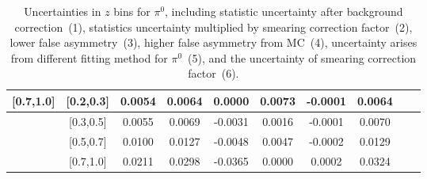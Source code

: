 \begin{table}[H]
\begin{tabular}{|c| c| c| c| c| c| c| c| c| c|}
[0.7,1.0]	&	[0.2,0.3]	&	0.0054	&	0.0064	&	0.0000	&	0.0073	&	-0.0001	&	0.0064	\\ \hline
[0.7,1.0]	&	[0.3,0.5]	&	0.0055	&	0.0069	&	-0.0031	&	0.0016	&	-0.0001	&	0.0070	\\ \hline
[0.7,1.0]	&	[0.5,0.7]	&	0.0100	&	0.0127	&	-0.0048	&	0.0047	&	-0.0002	&	0.0129	\\ \hline
[0.7,1.0]	&	[0.7,1.0]	&	0.0211	&	0.0298	&	-0.0365	&	0.0000	&	0.0002	&	0.0324	\\ \hline
\end{tabular}
\caption{Uncertainties in $z$ bins for $\pi^0$, including statistic uncertainty after background correction~(1), statistics uncertainty multiplied by smearing correction factor~(2), lower false asymmetry~(3), higher false asymmetry from MC~(4), uncertainty arises from different fitting method for $\pi^0$~(5), and the uncertainty of smearing correction factor~(6).}
\label{tab:pi0errors_z}
\end{table}

